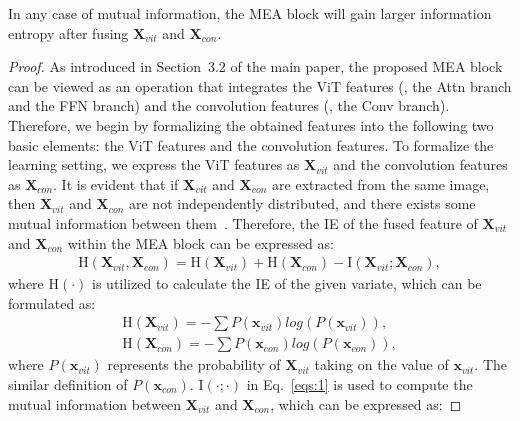 \begin{lemma}
In any case of mutual information, the MEA block will gain larger information entropy after fusing $\textbf{X}_{vit}$ and $\textbf{X}_{con}$.
\end{lemma}
\begin{proof}
As introduced in Section~3.2 of the main paper, the proposed MEA block can be viewed as an operation that integrates the ViT features (\ie, the Attn branch and the FFN branch) and the convolution features (\ie, the Conv branch). Therefore, we begin by formalizing the obtained features into the following two basic elements: the ViT features and the convolution features. To formalize the learning setting, we express the ViT features as $\textbf{X}_{vit}$ and the convolution features as $\textbf{X}_{con}$. It is evident that if $\textbf{X}_{vit}$ and $\textbf{X}_{con}$ are extracted from the same image, then $\textbf{X}_{vit}$ and $\textbf{X}_{con}$ are not independently distributed, and there exists some mutual information between them~\citep{zhang2022graph,wu2021cvt,zhang2023cae,peng2021conformer}. Therefore, the IE of the fused feature of $\textbf{X}_{vit}$ and $\textbf{X}_{con}$ within the MEA block can be expressed as:
\begin{equation}
\begin{split}
\label{eqs:1}
\textrm{H}(\textbf{X}_{vit}, \textbf{X}_{con}) = \textrm{H}(\textbf{X}_{vit}) + \textrm{H}(\textbf{X}_{con}) - \textrm{I}(\textbf{X}_{vit}; \textbf{X}_{con}),
\end{split}
\end{equation}
where $\textrm{H}(\cdot)$ is utilized to calculate the IE of the given variate, which can be formulated as:
\begin{equation}
\begin{split}
\label{eqs:2}
\textrm{H}(\textbf{X}_{vit}) = -\sum P(\textbf{x}_{vit}) log(P(\textbf{x}_{vit})),\\
\textrm{H}(\textbf{X}_{con}) = -\sum P(\textbf{x}_{con}) log(P(\textbf{x}_{con})),
\end{split}
\end{equation}
where $P(\textbf{x}_{vit})$ represents the probability of $\textbf{X}_{vit}$ taking on the value of $\textbf{x}_{vit}$. The similar definition of $P(\textbf{x}_{con})$. $\textrm{I}(\cdot;\cdot)$ in Eq.~\eqref{eqs:1} is used to compute the mutual information between $\textbf{X}_{vit}$ and $\textbf{X}_{con}$, which can be expressed as:

\end{proof}
